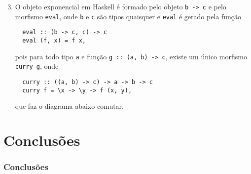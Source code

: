 \documentclass{beamer}
\begin{document}
  \begin{frame}[fragile]
    \begin{enumerate}
        \setcounter{enumi}{2}
  \item O objeto exponencial em Haskell \'e formado pelo objeto \texttt{b -> c} e pelo morfismo \texttt{eval}, onde \texttt{b} e \texttt{c} s\~ao tipos quaisquer 
    e \texttt{eval} \'e gerado pela fun\c{c}\~ao
\begin{verbatim}
  eval :: (b -> c, c) -> c
  eval (f, x) = f x,
\end{verbatim}
pois para todo tipo \texttt{a}
e fun\c{c}\~ao \texttt{g :: (a, b) -> c},
existe um \'unico morfismo \texttt{curry g},
onde 
\begin{verbatim}
  curry :: ((a, b) -> c) -> a -> b -> c
  curry f = \x -> \y -> f (x, y),
\end{verbatim}
que faz o diagrama abaixo comutar.
\begin{figure}[H]
    \centering
    \label{comuexp}
\end{figure}
\end{enumerate}
  \end{frame}

  \section{Conclus\~oes}
  \begin{frame}
    \frametitle{Conclus\~oes}
  \end{frame}
\end{document}
